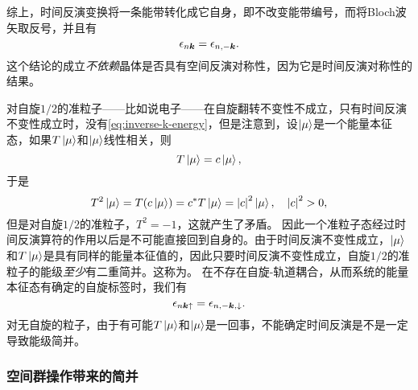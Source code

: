 综上，时间反演变换将一条能带转化成它自身，即不改变能带编号，而将Bloch波矢取反号，并且有
\begin{equation}
    \epsilon_{n \vb*{k}} = \epsilon_{n, -\vb*{k}}.
    \label{eq:inverse-k-energy}
\end{equation}
这个结论的成立\emph{不依赖}晶体是否具有空间反演对称性，因为它是时间反演对称性的结果。

对自旋$1/2$的准粒子——比如说电子——在自旋翻转不变性不成立，只有时间反演不变性成立时，没有\eqref{eq:inverse-k-energy}，但是注意到，设$\ket{\mu}$是一个能量本征态，如果$T \ket{\mu}$和$\ket{\mu}$线性相关，则
\[
    T \ket{\mu} = c \ket{\mu},
\]
于是
\[
    T^2 \ket{\mu} = T(c \ket{\mu}) = c^* T \ket{\mu} = \abs{c}^2 \ket{\mu}, \quad \abs{c}^2 > 0,
\]
但是对自旋$1/2$的准粒子，$T^2 = -1$，这就产生了矛盾。
因此一个准粒子态经过时间反演算符的作用以后是不可能直接回到自身的。由于时间反演不变性成立，$\ket{\mu}$和$T \ket{\mu}$是具有同样的能量本征值的，因此只要时间反演不变性成立，自旋$1/2$的准粒子的能级\emph{至少}有二重简并。这称为。
在不存在自旋-轨道耦合，从而系统的能量本征态有确定的自旋标签时，我们有
\begin{equation}
    \epsilon_{n \vb*{k} \uparrow} = \epsilon_{n, -\vb*{k}, \downarrow}.
\end{equation}
对无自旋的粒子，由于有可能$T \ket{\mu}$和$\ket{\mu}$是一回事，不能确定时间反演是不是一定导致能级简并。

\subsubsection{空间群操作带来的简并} 

